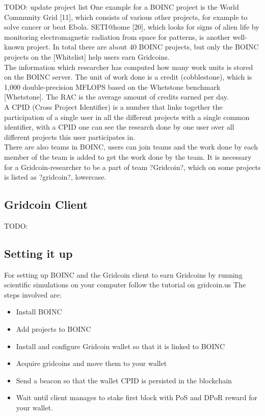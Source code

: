 TODO: update project list
One example for a BOINC project is the World Community Grid [11], which consists of various other projects, for example to solve cancer or beat Ebola. SETI@home [20], which looks for signs of alien life by monitoring electromagnetic radiation from space for patterns, is another well-known project.  In total there are about 40 BOINC projects, but only the BOINC projects on the [Whitelist] help users earn Gridcoins.\\

The information which researcher has computed how many work units is stored on the BOINC server. The unit of work done is a credit (cobblestone), which is 1,000 double-precision MFLOPS based on the Whetstone benchmark [Whetstone].  The RAC is the average amount of credits earned  per day.\\

A CPID (Cross Project Identifier) is a number that links together the participation of a single user in all the different projects with a single common identifier, with a CPID one can see the research done by one user over all different projects this user participates in.\\

There are also teams in BOINC, users can join teams and the work done by each member of the team is added to get the work done by the team. It is necessary for a Gridcoin-researcher to be a part of team ?Gridcoin?, which on some projects is listed as ?gridcoin?, lowercase.

\subsection{Gridcoin Client}

TODO: 

\subsection{Setting it up}

For setting up BOINC and the Gridcoin client to earn Gridcoins by running scientific simulations on your computer follow the tutorial on gridcoin.us
The steps involved are:
\begin{itemize}
  \item Install BOINC
  \item Add projects to BOINC
  \item Install and configure Gridcoin wallet so that it is linked to BOINC 
  \item Acquire gridcoins and move them to your wallet
  \item Send a beacon so that the wallet CPID is persisted in the blockchain
  \item Wait until client manages to stake first block with PoS and DPoR reward for your wallet.
\end{itemize}
